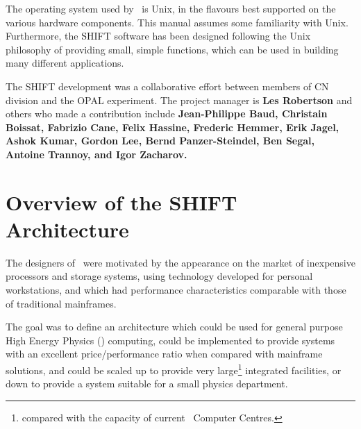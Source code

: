 The operating system used by \shift\ is Unix\TM, in the flavours best
supported on the various hardware components. This manual assumes some
familiarity with Unix. Furthermore, the SHIFT software has been designed
following the Unix philosophy of providing small, simple functions,
which can be used in building many different applications.
 
The SHIFT development was a collaborative effort between members of CN
division and the OPAL experiment. The project manager is {\bf Les Robertson} and
others who made a contribution include
{\bf Jean-Philippe Baud, Christain Boissat, Fabrizio Cane, Felix Hassine,
 Frederic Hemmer,
Erik Jagel, Ashok Kumar, Gordon Lee, Bernd Panzer-Steindel, Ben Segal,
Antoine Trannoy, and Igor Zacharov.}
 
\chapter{Overview of the SHIFT Architecture}
 
The designers of \shift\ were motivated by
the appearance on the market of inexpensive
processors and storage systems, using technology developed for personal
 workstations,
and which had performance characteristics comparable with those of traditional
mainframes.
 
The goal was to define an architecture which could be used for general purpose
High Energy Physics (\HEP) computing,
could be implemented to provide systems
with an excellent price/performance ratio when compared
with mainframe solutions, and could be scaled up to provide very
 large\footnote{compared
with the capacity of current \HEP\ Computer Centres.}
integrated facilities, or down to provide a system suitable for a small
physics department.
 
